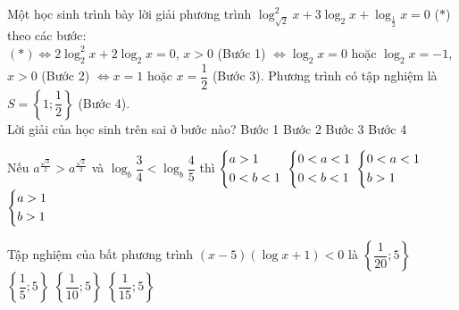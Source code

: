 \begin{ex}%
Một học sinh trình bày lời giải phương trình $\log_{\sqrt{2}}^{2}x+3\log_{2}x+\log_{\frac{1}{2}}x=0$ ($*$) theo các bước:\\
$(*)\Leftrightarrow 2\log_{2}^{2}x+2\log_{2}x=0$, $x>0$ (Bước 1) $\Leftrightarrow \log_{2}x=0$ hoặc $\log_{2}x=-1$, $x>0$ (Bước 2) $\Leftrightarrow x=1$ hoặc $x=\dfrac{1}{2}$ (Bước 3). Phương trình có tập nghiệm là $S=\left\{1;\dfrac{1}{2}\right\}$ (Bước 4).\\
Lời giải của học sinh trên sai ở bước nào?
\choice
{\True Bước 1}
{Bước 2}
{Bước 3}
{Bước 4}
\end{ex}
\begin{ex}%
Nếu $a^{\frac{\sqrt{3}}{2}}>a^{\frac{\sqrt{2}}{2}}$ và $\log_{b}\dfrac{3}{4}<\log_{b}\dfrac{4}{5}$ thì
\choice
{$\left\{\begin{aligned}&a>1\\ & 0<b<1\end{aligned}\right.$}
{$\left\{\begin{aligned}&0<a<1\\ & 0<b<1\end{aligned}\right.$}
{$\left\{\begin{aligned}&0<a<1\\ & b>1\end{aligned}\right.$}
{\True $\left\{\begin{aligned}&a>1\\ & b>1\end{aligned}\right.$}
\end{ex}
\begin{ex}%
Tập nghiệm của bất phương trình $(x-5)(\log x+1)<0$ là
\choice
{$\left\{\dfrac{1}{20};5\right\}$}
{$\left\{\dfrac{1}{5};5\right\}$}
{\True $\left\{\dfrac{1}{10};5\right\}$}
{$\left\{\dfrac{1}{15};5\right\}$}
\end{ex}
